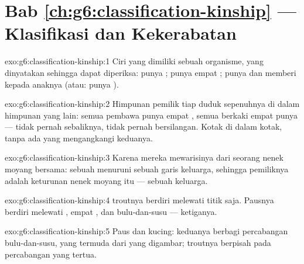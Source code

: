\section*{Bab \ref{ch:g6:classification-kinship} --- Klasifikasi dan Kekerabatan}

\begin{solution}{exo:g6:classification-kinship:1}
Ciri yang dimiliki sebuah organisme, yang dinyatakan sehingga dapat
diperiksa: punya ; punya empat ; punya
 dan memberi  kepada anaknya (atau: punya ).
\end{solution}

\begin{solution}{exo:g6:classification-kinship:2}
Himpunan pemilik tiap  duduk sepenuhnya di dalam himpunan
 yang lain: semua pembawa  punya empat , semua
 berkaki empat punya  --- tidak pernah
sebaliknya, tidak pernah bersilangan. Kotak di dalam kotak, tanpa ada
yang mengangkangi keduanya.
\end{solution}

\begin{solution}{exo:g6:classification-kinship:3}
Karena mereka mewarisinya dari seorang nenek moyang bersama: sebuah
 menuruni sebuah garis keluarga, sehingga pemiliknya adalah
keturunan nenek moyang itu --- sebuah keluarga.
\end{solution}

\begin{solution}{exo:g6:classification-kinship:4}
 troutnya berdiri melewati titik  saja. Pausnya
berdiri melewati , empat , dan
bulu-dan-susu --- ketiganya.
\end{solution}

\begin{solution}{exo:g6:classification-kinship:5}
Paus dan kucing: keduanya berbagi percabangan bulu-dan-susu, yang
termuda dari yang digambar;  troutnya berpisah pada percabangan
yang tertua.
\end{solution}

